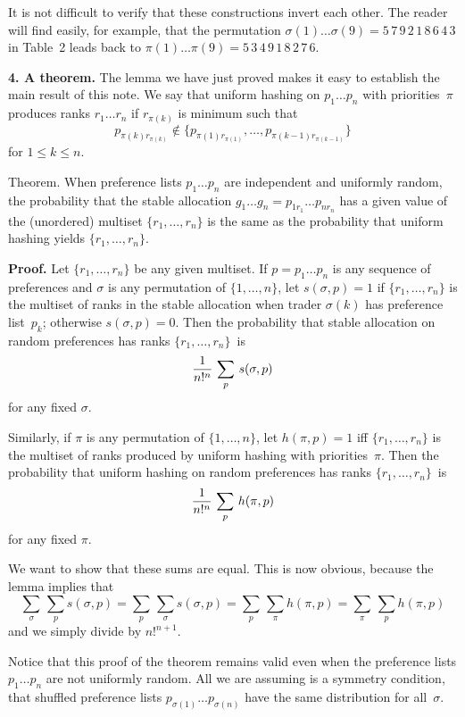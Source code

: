 It is not difficult to verify that these constructions invert each other. The
reader will find easily, for example, that the permutation $\sigma(1)\ldots
\sigma(9)=5\,7\,9\,2\,1\,8\,6\,4\,3$ in Table~2 leads back to
$\pi(1)\ldots\pi(9)=5\,3\,4\,9\,1\,8\,2\,7\,6$. \ \pfbox

\meno
{\bf 4. A theorem.}
The lemma we have just proved makes it easy to establish the main result of
this note. We say that uniform hashing on $p_1\ldots p_n$ with priorities~$\pi$
produces ranks $r_1\ldots r_n$ if $r_{\pi(k)}$ is minimum such that
$$p_{\pi(k)r_{\pi(k)}}\not\in
\{p_{\pi(1)r_{\pi(1)}},\ldots,p_{\pi(k-1)r_{\pi(k-1)}}\}$$
for $1\leq k\leq n$.

\proclaim
Theorem. When preference lists $p_1\ldots p_n$ are independent and uniformly
random, the probability that the stable allocation $g_1\ldots
g_n=p_{1r_1}\ldots p_{nr_n}$ has a given value of the (unordered) multiset
$\{r_1,\ldots,r_n\}$ is the same as the probability that uniform hashing yields
$\{r_1,\ldots,r_n\}$.

\noindent
{\bf Proof.}
Let $\{r_1,\ldots,r_n\}$ be any given multiset. If $p=p_1\ldots p_n$ is any
sequence of preferences and $\sigma$ is any permutation of $\{1,\ldots,n\}$,
let $s(\sigma,p)=1$ if $\{r_1,\ldots,r_n\}$ is the multiset of ranks in the
stable allocation when trader $\sigma(k)$ has preference list~$p_k$; otherwise
$s(\sigma,p)=0$. 
Then the probability that stable allocation on random preferences has ranks
$\{r_1,\ldots,r_n\}$~is
$${1\over n!^n}\,\sum_p\,s(\sigma,p)$$
for any fixed $\sigma$. 

Similarly, if $\pi$ is any permutation of $\{1,\ldots,n\}$, let $h(\pi,p)=1$
iff $\{r_1,\ldots,r_n\}$ is the multiset of ranks produced by uniform hashing
with priorities~$\pi$.
Then the probability that uniform hashing on random preferences has ranks
$\{r_1,\ldots,r_n\}$~is
$${1\over n!^n}\,\sum_p\,h(\pi,p)$$
for any fixed $\pi$.

We want to show that these sums are equal. This is now obvious, because the
lemma implies that
$$\sum_{\sigma}\,\sum_ps(\sigma,p)=\sum_p\,\sum_{\sigma}s(\sigma,p)
=\sum_p\,\sum_{\pi}h(\pi,p)=\sum_{\pi}\,\sum_ph(\pi,p)$$
and we simply divide by $n!^{n+1}$. \ \pfbox

\medskip
Notice that this proof of the theorem remains valid even when the preference
lists $p_1\ldots p_n$ are not uniformly random. All we are assuming is a
symmetry condition, that shuffled preference lists $p_{\sigma(1)}\ldots
p_{\sigma(n)}$ have the same distribution for all~$\sigma$.

